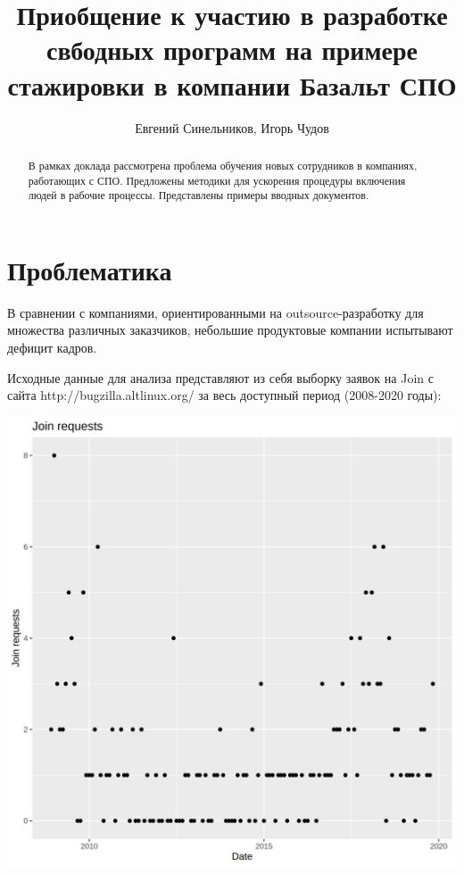\author{Евгений Синельников, Игорь Чудов}
\title{Приобщение к участию в разработке свбодных программ на примере
стажировки в компании Базальт СПО}
\maketitle

\begin{abstract}
  В рамках доклада рассмотрена проблема обучения новых
  сотрудников в компаниях, работающих с СПО. Предложены методики для
  ускорения процедуры включения людей в рабочие процессы. Представлены
  примеры вводных документов.
\end{abstract}


\section{Проблематика}

В сравнении с компаниями, ориентированными на outsource-разработку для
множества различных заказчиков, небольшие продуктовые компании
испытывают дефицит кадров.

Исходные данные для анализа представляют из себя выборку заявок на Join
с сайта http://bugzilla.altlinux.org/ за весь доступный период (2008-2020 годы):

\includegraphics{ggplot}

